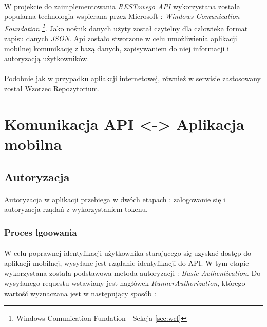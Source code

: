 \paragraph{} %
\label{par:}
W projekcie do zaimplementowania \textit{RESTowego API} wykorzystana została popularna technologia wspierana przez Microsoft : \textit{Windows Comunication Foundation \footnote{ Windows Comunication Fundation - Sekcja \ref{sec:wcf}}}. Jako nośnik danych użyty został czytelny dla człowieka format zapisu danych \textit{JSON}. Api zostało stworzone w celu umożliwienia aplikacji mobilnej komunikację z bazą danych, zapisywaniem do niej informacji i autoryzacją użytkowników.

\paragraph{} %
\label{par:}
Podobnie jak w przypadku apliakcji internetowej, również w serwisie zastosowany został Wzorzec Repozytorium.

\section{Komunikacja API <-> Aplikacja mobilna} %
\label{sec:komunikacja_api_aplikacja_mobilna}

\subsection{Autoryzacja} %
\label{sub:autoryzacja}
\paragraph{} %
\label{par:}

Autoryzacja w aplikacji przebiega w dwóch etapach : zalogowanie się i autoryzacja rządań z wykorzystaniem tokenu. 
\subsubsection{Proces lgoowania} 
\paragraph{} %
\label{par:}
W celu poprawnej identyfikacji użytkownika starającego się uzyskać dostęp do aplikacji mobilnej, wysyłane jest rządanie identyfikacji do API. W tym etapie wykorzystana została podstawowa metoda autoryzacji : \textit{Basic Authentication}. Do wysyłanego requestu wstawiany jest nagłówek \textit{RunnerAuthorization}, którego wartość wyznaczana jest w następujący sposób :

